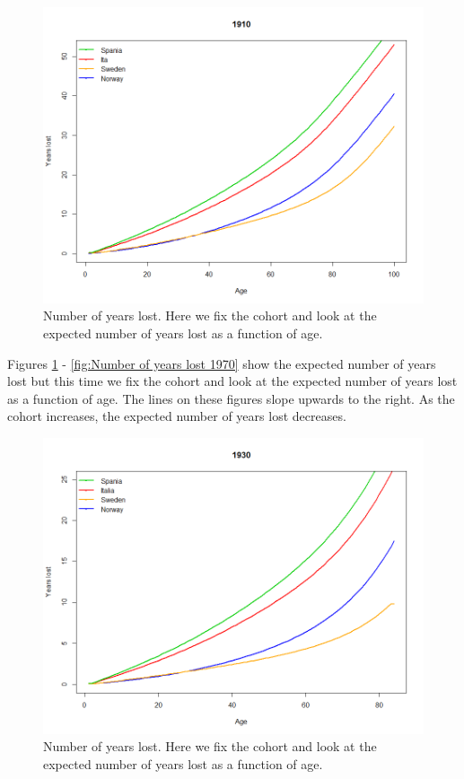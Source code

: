               \begin{figure}[tbh]
             \centering
              \includegraphics[width=0.8\linewidth]{figures/antal_tapteAs_functionCohort_AllCountries1910.png}
              \caption{Number of years lost. Here we fix the cohort and look at the expected number of years lost as a function of age.}
              \label{fig:Number of years lost 1910}
            \end{figure}   
             
 Figures \ref{fig:Number of years lost 1910} - \ref{fig:Number of years lost 1970} show the expected number of years lost but this time we fix the cohort and look at the expected number of years lost as a function of age.  
 The lines on these figures slope upwards to the right.
 As the cohort increases, the expected number of years lost decreases.

              \begin{figure}[tbh]
             \centering
              \includegraphics[width=0.8\linewidth]{figures/antal_tapteAs_functionCohort_AllCountries1930.png}
              \caption{Number of years lost. Here we fix the cohort and look at the expected number of years lost as a function of age.}
              \label{fig:Number of years lost 1930}
            \end{figure}   
            

